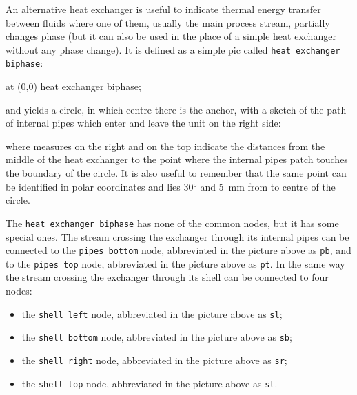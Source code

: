 \documentclass[12pt]{article}						%
\newcommand*{\chpn}[1]{\texttt{#1}}				%
\newcommand*{\chpp}[1]{\texttt{#1}}				%
\begin{document}
An alternative heat exchanger is useful to indicate thermal energy transfer
between fluids where one of them, usually the main process stream, partially
changes phase (but it can also be used in the place of a simple heat exchanger
without any phase change). It is defined as a simple pic called
\chpp{heat exchanger biphase}:
\begin{chpcode}
	\pic at (0,0) {heat exchanger biphase};
\end{chpcode}
and yields a circle, in which centre there is the anchor, with a sketch of the
path of internal pipes which enter and leave the unit on the right side:
\begin{center}
\end{center}
where measures on the right and on the top indicate the distances from the
middle of the heat exchanger to the point where the internal pipes patch
touches the boundary of the circle. It is also useful to remember that the same
point can be identified in polar coordinates and lies \ang{30} and \SI{5}{\mm}
from to centre of the circle.

The \chpp{heat exchanger biphase} has none of the common nodes, but it has some
special ones. The stream crossing the exchanger through its internal pipes can
be connected to the \chpn{pipes bottom} node, abbreviated in the picture above
as \chpn{pb}, and to the \chpn{pipes top} node, abbreviated in the picture above
as \chpn{pt}. In the same way the stream crossing the exchanger through its
shell can be connected to four nodes:
\begin{itemize}
	\item the \chpn{shell left} node, abbreviated in the picture above as
		\chpn{sl};
	\item the \chpn{shell bottom} node, abbreviated in the picture above as
		\chpn{sb};
	\item the \chpn{shell right} node, abbreviated in the picture above as
		\chpn{sr};
	\item the \chpn{shell top} node, abbreviated in the picture above as
		\chpn{st}.
\end{itemize}
\end{document}
